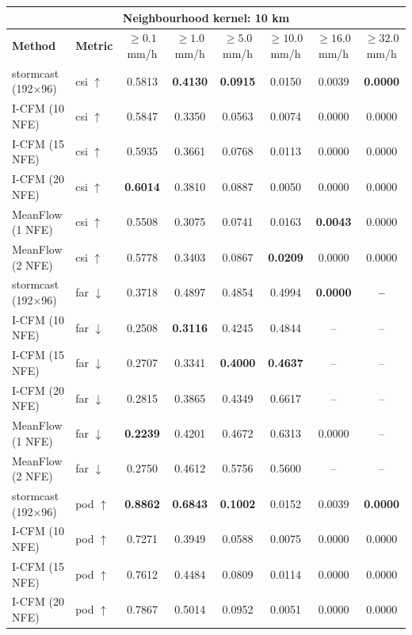 \documentclass[border=10pt]{standalone}
\begin{document}
\begin{tabular}{llcccccc}
\toprule
\multicolumn{8}{c}{\textbf{Neighbourhood kernel: 10 km}} \\
\midrule
\textbf{Method} & \textbf{Metric} & $\geq 0.1$ mm/h & $\geq 1.0$ mm/h & $\geq 5.0$ mm/h & $\geq 10.0$ mm/h & $\geq 16.0$ mm/h & $\geq 32.0$ mm/h \\
\midrule
stormcast (192$\times$96) & csi $\uparrow$ & 0.5813 & \textbf{0.4130} & \textbf{0.0915} & 0.0150 & 0.0039 & \textbf{0.0000} \\
I-CFM (10 NFE) & csi $\uparrow$ & 0.5847 & 0.3350 & 0.0563 & 0.0074 & 0.0000 & 0.0000 \\
I-CFM (15 NFE) & csi $\uparrow$ & 0.5935 & 0.3661 & 0.0768 & 0.0113 & 0.0000 & 0.0000 \\
I-CFM (20 NFE) & csi $\uparrow$ & \textbf{0.6014} & 0.3810 & 0.0887 & 0.0050 & 0.0000 & 0.0000 \\
MeanFlow (1 NFE) & csi $\uparrow$ & 0.5508 & 0.3075 & 0.0741 & 0.0163 & \textbf{0.0043} & 0.0000 \\
MeanFlow (2 NFE) & csi $\uparrow$ & 0.5778 & 0.3403 & 0.0867 & \textbf{0.0209} & 0.0000 & 0.0000 \\
\midrule
stormcast (192$\times$96) & far $\downarrow$ & 0.3718 & 0.4897 & 0.4854 & 0.4994 & \textbf{0.0000} & \textbf{--} \\
I-CFM (10 NFE) & far $\downarrow$ & 0.2508 & \textbf{0.3116} & 0.4245 & 0.4844 & -- & -- \\
I-CFM (15 NFE) & far $\downarrow$ & 0.2707 & 0.3341 & \textbf{0.4000} & \textbf{0.4637} & -- & -- \\
I-CFM (20 NFE) & far $\downarrow$ & 0.2815 & 0.3865 & 0.4349 & 0.6617 & -- & -- \\
MeanFlow (1 NFE) & far $\downarrow$ & \textbf{0.2239} & 0.4201 & 0.4672 & 0.6313 & 0.0000 & -- \\
MeanFlow (2 NFE) & far $\downarrow$ & 0.2750 & 0.4612 & 0.5756 & 0.5600 & -- & -- \\
\midrule
stormcast (192$\times$96) & pod $\uparrow$ & \textbf{0.8862} & \textbf{0.6843} & \textbf{0.1002} & 0.0152 & 0.0039 & \textbf{0.0000} \\
I-CFM (10 NFE) & pod $\uparrow$ & 0.7271 & 0.3949 & 0.0588 & 0.0075 & 0.0000 & 0.0000 \\
I-CFM (15 NFE) & pod $\uparrow$ & 0.7612 & 0.4484 & 0.0809 & 0.0114 & 0.0000 & 0.0000 \\
I-CFM (20 NFE) & pod $\uparrow$ & 0.7867 & 0.5014 & 0.0952 & 0.0051 & 0.0000 & 0.0000 \\

\end{tabular}
\end{document}
